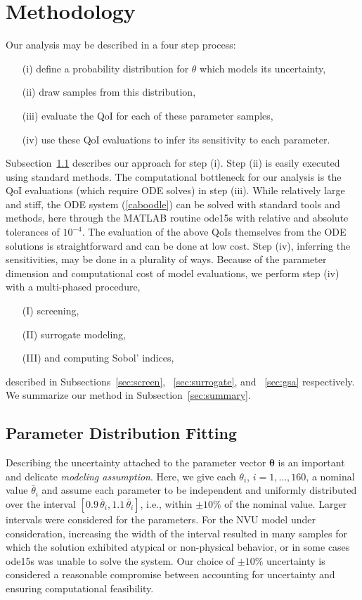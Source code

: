\section{Methodology}\label{sec:meth}

Our analysis may be described in a four step process:
\begin{enumerate}
\item[(i)] define a probability distribution for $\theta$ which models its uncertainty,
\item[(ii)] draw samples from this distribution, 
\item[(iii)] evaluate the QoI for each of these parameter samples,
\item[(iv)] use these QoI evaluations to infer its sensitivity to each parameter. 
\end{enumerate}
Subsection~\ref{sec:param_dist_fit} describes our approach for step (i). Step (ii) is easily executed using standard methods. The computational bottleneck for our analysis is the QoI evaluations (which require ODE solves) in step (iii). While relatively large and stiff, the ODE system (\ref{caboodle}) can be  solved with standard tools and methods, here through the MATLAB routine ode15s with relative and absolute tolerances of $10^{-4}$. The evaluation of the above QoIs themselves from the ODE solutions is straightforward and can be done at low cost. Step (iv), inferring the sensitivities, may be done in a plurality of ways. Because of the parameter dimension and computational cost of model evaluations, we perform step (iv) with a multi-phased procedure,
\begin{enumerate}
\item[(I)] screening,
\item[(II)] surrogate modeling,
 \item[(III)] and computing Sobol' indices,
 \end{enumerate}
 described in Subsections~\ref{sec:screen}, ~\ref{sec:surrogate}, and ~\ref{sec:gsa} respectively. We summarize our method in Subsection~\ref{sec:summary}.

\subsection{Parameter Distribution Fitting}
\label{sec:param_dist_fit}

Describing the uncertainty attached to the parameter vector $\boldsymbol{\theta}$ is an important and delicate {\sl modeling assumption}. Here, we give each $\theta_i$, $i=1,\dots, 160$, a nominal value $\bar \theta_i$ and assume each parameter to be independent and uniformly distributed over the interval $[0.9\, \bar\theta_i, 1.1 \,\bar\theta_i]$, i.e., within $\pm 10\%$ of the nominal value. Larger intervals were considered for the parameters. For the NVU model under consideration, increasing the width of the interval resulted in many samples for which the solution exhibited atypical or non-physical behavior, or in some cases ode15s was unable to solve the system. Our choice of $\pm 10\%$ uncertainty is considered a reasonable compromise between accounting for uncertainty and ensuring computational feasibility. 
	
